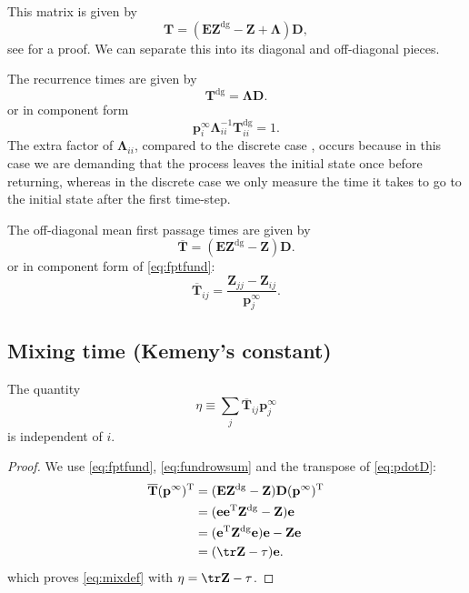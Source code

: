 \documentclass{article} %
\newcommand{\inv}{^{-1}}
\newcommand{\dg}{^\mathrm{dg}}
\newcommand{\trans}{^\mathrm{T}}
\newcommand{\onev}{\mathbf{e}}
\newcommand{\onem}{\mathbf{E}}
\newcommand{\pr}{\mathbf{p}}
\newcommand{\eq}{\pr^\infty}
\newcommand{\fpt}{\mathbf{T}}
\newcommand{\fptb}{\overline{\fpt}}
\newcommand{\fund}{\mathbf{Z}}
\newcommand{\D}{\mathbf{D}}
\newcommand{\Lb}{\boldsymbol{\Lambda}}
\begin{document}
This matrix is given by
%
\begin{equation}\label{eq:fpt}
  \fpt=(\onem\fund\dg - \fund + \Lb)\D,
\end{equation}
%
see \cite{Yao1985fpt} for a proof.
We can separate this into its diagonal and off-diagonal pieces.

The recurrence times are given by
%
\begin{equation}\label{eq:recurtime}
  \fpt\dg = \Lb\D.
\end{equation}
%
or in component form
%
\begin{equation*}
  \eq_i \Lb_{ii}\inv \fpt\dg_{ii} = 1.
\end{equation*}
%
The extra factor of $\Lb_{ii}$, compared to the discrete case \cite[Th.4.4.5]{kemeny1960finite}, occurs because in this case we are demanding that the process leaves the initial state once before returning, whereas in the discrete case we only measure the time it takes to go to the initial state after the first time-step.

The off-diagonal mean first passage times are given by
%
\begin{equation}\label{eq:fptfund}
  \fptb = (\onem\fund\dg - \fund)\D.
\end{equation}
%
or in component form of \eqref{eq:fptfund}:
%
\begin{equation}\label{eq:fptfundcmpt}
  \fptb_{ij} = \frac{\fund_{jj}-\fund_{ij}}{\eq_j}.
\end{equation}
%

\subsection{Mixing time (Kemeny's constant)}\label{sec:mixtime}

\begin{thm}\label{th:kemenyconst}
  The quantity
  \begin{equation}\label{eq:mixdef}
    \eta \equiv \sum_j \fptb_{ij}\eq_j
  \end{equation}
  is independent of $i$.
\end{thm}
\begin{proof}
  We use \eqref{eq:fptfund}, \eqref{eq:fundrowsum} and the transpose of \eqref{eq:pdotD}:
  \begin{equation*}
    \begin{aligned}
      \fptb (\eq)\trans &= (\onem\fund\dg - \fund) \D (\eq)\trans \\
        &= (\onev\onev\trans\fund\dg - \fund) \onev \\
        &= (\onev\trans\fund\dg\onev)\onev - \fund\onev \\
        &= (\tr\fund - \tau)\onev.
    \end{aligned}
  \end{equation*}
  which proves \eqref{eq:mixdef} with $\eta = \tr\fund - \tau$.
\end{proof}
\end{document}
